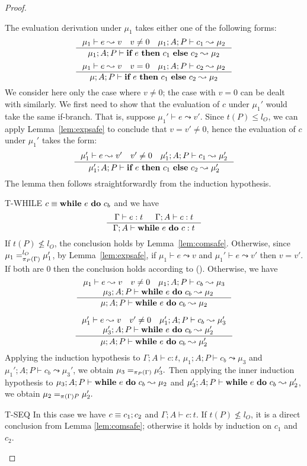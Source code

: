 {{{\begin{proof}
\begin{ProofEnumDesc}
The evaluation derivation under $\mu_1$
takes either one of the following forms:
$$
\inference{\mu_1 \vdash e \leadsto v\quad v\neq 0\quad \mu_1; A; P \vdash c_1 \leadsto \mu_2}
{\mu_1; A; P \vdash \lcIF{e}{c_1}{c_2} \leadsto \mu_2}
$$
$$
\inference{\mu_1 \vdash e \leadsto v\quad v = 0\quad \mu_1;A; P \vdash c_2 \leadsto \mu_2}
{\mu;A; P \vdash \lcIF{e}{c_1}{c_2} \leadsto \mu_2}
$$
We consider here only the case where $v\not = 0$; the case with $v=0$
can be dealt with similarly.
We first need to show that the evaluation of $c$ under $\mu_1'$
would take the same if-branch. That is, suppose $\mu_1' \vdash e \leadsto v'$.
Since $t(P) \leq l_O$, we can apply Lemma~\ref{lem:expsafe} to conclude
that $v=v' \not = 0$, hence the evaluation of $c$ under $\mu_1'$ takes the
form:
$$
\inference{\mu_1' \vdash e \leadsto v'\quad v'\neq 0\quad \mu_1'; A; P \vdash c_1 \leadsto \mu_2'}
{\mu_1'; A; P \vdash \lcIF{e}{c_1}{c_2} \leadsto \mu_2'}
$$
The lemma then follows straightforwardly from the induction hypothesis.

\item[T-WHILE] $c\equiv\textbf{while}~{e}~\textbf{do}~{c_b}$ and we have
$$
\inference
{\Gamma \vdash e : t & \Gamma ; A\vdash c : t  }
{\Gamma; A \vdash \lcWHILE{e}{c} : t }
$$
If $t(P) \nleq l_{O}$, the conclusion holds by
Lemma~\ref{lem:comsafe}. Otherwise, since
$\mu_1=_{\pi_{{P}}({\Gamma})}^{l_{O}}\mu_1'$, by
Lemma~\ref{lem:expsafe}, if
$\mu_1 \vdash e \leadsto v$ and $\mu_1' \vdash e \leadsto v'$
then $v=v'$.
If both are $0$ then the conclusion holds according to
(). Otherwise, we have
$$
\inference{
\mu_1 \vdash e \leadsto v\quad v\neq 0\quad
\mu_1;A; P \vdash c_b \leadsto \mu_3\\
\quad \mu_3 ; A ; P \vdash \lcWHILE{e}{c_b} \leadsto \mu_2
}
{\mu;A; P \vdash \lcWHILE{e}{c_b} \leadsto \mu_2}
$$

$$
\inference{
\mu_1' \vdash e \leadsto v\quad v'\neq 0\quad
\mu_1';A; P \vdash c_b \leadsto \mu_3'\\
\quad \mu_3' ; A ; P \vdash \lcWHILE{e}{c_b} \leadsto \mu_2'
}
{\mu;A; P \vdash \lcWHILE{e}{c_b} \leadsto \mu_2'}
$$
Applying the induction hypothesis to $\Gamma ; A\vdash c : t$,
$\mu_1;A; P \vdash c_b \leadsto \mu_3$ and
$\mu_1';A; P \vdash c_b \leadsto \mu_3'$, we obtain
$\mu_3 =_{\pi_{{P}}({\Gamma})} \mu_3'.$ Then applying the inner
induction hypothesis to $\mu_3 ; A ; P \vdash \textbf{while}~{e}~\textbf{do}~{c_b} \leadsto \mu_2$
and $\mu_3' ; A ; P \vdash \textbf{while}~{e}~\textbf{do}~{c_b} \leadsto \mu_2'$,
we obtain $\mu_2 =_{\app{\Gamma} P} \mu_2'.$

\item[T-SEQ] In this case we have
  $c\equiv{c_1};{c_2}$ and $\Gamma;A\vdash c:t$. If $t(P)\not\leq l_{O}$, it is a direct conclusion from Lemma \ref{lem:comsafe}; otherwise it holds by induction on $c_1$ and $c_2$.


\end{ProofEnumDesc}
\end{proof}}}}
